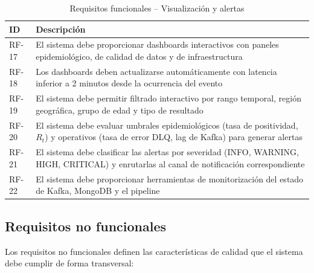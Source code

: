 \documentclass[12pt,a4paper]{article}
\begin{document}
\begin{table}[H]
    \centering
    \caption{Requisitos funcionales -- Visualización y alertas}
    \begin{tabular}{@{}p{1.5cm}p{12cm}@{}}
        \toprule
        \textbf{ID} & \textbf{Descripción}                                                                                                                              \\
        \midrule
        RF-17       & El sistema debe proporcionar dashboards interactivos con paneles epidemiológico, de calidad de datos y de infraestructura                         \\
        RF-18       & Los dashboards deben actualizarse automáticamente con latencia inferior a 2 minutos desde la ocurrencia del evento                                \\
        RF-19       & El sistema debe permitir filtrado interactivo por rango temporal, región geográfica, grupo de edad y tipo de resultado                            \\
        RF-20       & El sistema debe evaluar umbrales epidemiológicos (tasa de positividad, $R_t$) y operativos (tasa de error DLQ, lag de Kafka) para generar alertas \\
        RF-21       & El sistema debe clasificar las alertas por severidad (INFO, WARNING, HIGH, CRITICAL) y enrutarlas al canal de notificación correspondiente        \\
        RF-22       & El sistema debe proporcionar herramientas de monitorización del estado de Kafka, MongoDB y el pipeline                                            \\
        \bottomrule
    \end{tabular}
\end{table}

\subsection{\texorpdfstring{Requisitos no funcionales}{Requisitos no funcionales}}\label{requisitos-no-funcionales}

Los requisitos no funcionales definen las características de calidad que el sistema debe cumplir de forma transversal:
\end{document}
